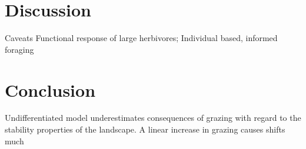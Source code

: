 \section{Discussion}

Caveats
Functional response of large herbivores; Individual based, informed foraging


\section{Conclusion}
Undifferentiated model underestimates consequences of grazing with regard to the stability properties of the landscape. 
A linear increase in grazing causes shifts much  
